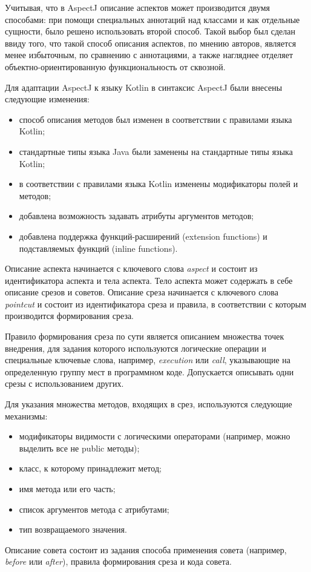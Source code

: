 \documentclass[conference]{IEEEtran}
\begin{document}
Учитывая, что в AspectJ описание аспектов может производится двумя способами:
при помощи специальных аннотаций над классами и как отдельные сущности, было
решено использовать второй способ.
Такой выбор был сделан ввиду того, что такой способ описания аспектов, по мнению
авторов, является менее избыточным, по сравнению с аннотациями, а также
нагляднее отделяет объектно-ориентированную функциональность от сквозной.

Для адаптации AspectJ к языку Kotlin в синтаксис AspectJ были внесены следующие
изменения:
\begin{itemize}
	\item способ описания методов был изменен в соответствии с правилами языка
	      Kotlin;
	\item стандартные типы языка Java были заменены на стандартные типы языка
		  Kotlin;
	\item в соответствии с правилами языка Kotlin изменены модификаторы полей и
	      методов;
	\item добавлена возможность задавать атрибуты аргументов методов;
	\item добавлена поддержка функций-расширений (extension functions) и
	      подставляемых  функций (inline functions).
\end{itemize}

Описание аспекта начинается с ключевого слова \textit{aspect} и состоит из 
идентификатора аспекта и тела аспекта.
Тело аспекта может содержать в себе описание срезов и советов.
Описание среза начинается с ключевого слова \textit{pointcut} и состоит из
идентификатора среза и правила, в соответствии с которым производится
формирования среза.

Правило формирования среза по сути является описанием множества точек внедрения, 
для задания которого используются логические операции и специальные ключевые 
слова, например, \textit{execution} или \textit{call}, указывающие на
определенную группу мест в программном коде.
Допускается описывать одни срезы с использованием других. 

Для указания множества методов, входящих в срез, используются следующие
механизмы:
\begin{itemize}
    \item модификаторы видимости с логическими операторами (например, можно
          выделить все не public методы);
    \item класс, к которому принадлежит метод;
    \item имя метода или его часть;
    \item список аргументов метода с атрибутами;
    \item тип возвращаемого значения.
\end{itemize}
Описание совета состоит из задания способа применения совета (например,
\textit{before} или \textit{after}), правила формирования среза и кода совета.
\end{document}
